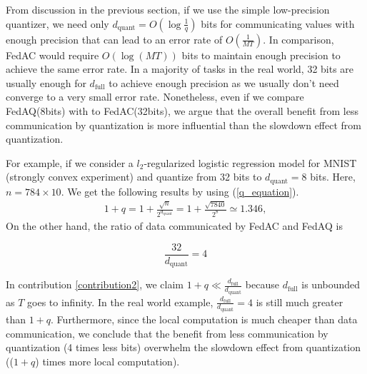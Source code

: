From discussion in the previous section, if we use the simple low-precision quantizer, we need only $d_{\text{quant}} = O(\log \frac{1}{q})$ bits for communicating values with enough precision that can lead to an error rate of $O(\frac{1}{MT})$. In comparison, FedAC would require $O(\log (MT))$ bits to maintain enough precision to achieve the same error rate. In a majority of tasks in the real world, 32 bits are usually enough for $d_{\textrm{full}}$ to achieve enough precision as we usually don't need converge to a very small error rate. Nonetheless, even if we compare FedAQ(8bits) with to FedAC(32bits), we argue that the overall benefit from less communication by quantization is more influential than the slowdown effect from quantization.

For example, if we consider a $l_2$-regularized logistic regression model for MNIST (strongly convex experiment) and quantize from 32 bits to $d_{\text{quant}} = 8$ bits. Here, $n = 784 \times 10$. We get the following results by using (\ref{q_equation}).
\begin{align*} %
    1+q = 1+ \frac{\sqrt{n}}{2^{d_{\textrm{quant}}}} = 1+\frac{\sqrt{7840}}{2^8} \simeq 1.346, \textrm{} 
\end{align*}
On the other hand, the ratio of data communicated by FedAC and FedAQ is

\begin{equation*}
    \frac{32}{d_{\textrm{quant}}} = 4 
\end{equation*}

In contribution \ref{contribution2}, we claim $1+q \ll \frac{d_{\text{full}}}{d_{\text{quant}}}$ because $d_{\textrm{full}}$ is unbounded as $T$ goes to infinity. In the real world example, $\frac{d_{\text{full}}}{d_{\text{quant}}}=4$ is still much greater than $1+q$. Furthermore, since the local computation is much cheaper than data communication, we conclude that the benefit from less communication by quantization (4 times less bits) overwhelm the slowdown effect from quantization (($1+q$) times more local computation).